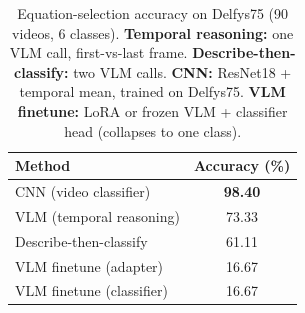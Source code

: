 
\begin{table}[t]
  \centering
  \caption{Equation-selection accuracy on Delfys75 (90 videos, 6 classes). \textbf{Temporal reasoning:} one VLM call, first-vs-last frame. \textbf{Describe-then-classify:} two VLM calls. \textbf{CNN:} ResNet18 + temporal mean, trained on Delfys75. \textbf{VLM finetune:} LoRA or frozen VLM + classifier head (collapses to one class).}
  \label{tab:delfys75_equation_selection}
  \small
  \setlength{\tabcolsep}{6pt}
  \renewcommand{\arraystretch}{1.2}
  \begin{tabular}{@{}lc@{}}
    \toprule
    \textbf{Method} & \textbf{Accuracy (\%)} \\
    \midrule
    CNN (video classifier)     & \cellcolor{bestcolor}\textbf{98.40} \\
    VLM (temporal reasoning)    & 73.33 \\
    Describe-then-classify      & 61.11 \\
    VLM finetune (adapter)      & 16.67 \\
    VLM finetune (classifier)   & 16.67 \\
    \bottomrule
  \end{tabular}
\end{table}
